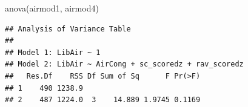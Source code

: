 \documentclass[
]{article}
\newenvironment{Shaded}{\begin{snugshade}}{\end{snugshade}}
\newcommand{\FunctionTok}[1]{\textcolor[rgb]{0.00,0.00,0.00}{#1}}
\newcommand{\NormalTok}[1]{#1}
\begin{document}
\begin{Shaded}
\begin{Highlighting}[]
\FunctionTok{anova}\NormalTok{(airmod1, airmod4)}
\end{Highlighting}
\end{Shaded}

\begin{verbatim}
## Analysis of Variance Table
## 
## Model 1: LibAir ~ 1
## Model 2: LibAir ~ AirCong + sc_scoredz + rav_scoredz
##   Res.Df    RSS Df Sum of Sq      F Pr(>F)
## 1    490 1238.9                           
## 2    487 1224.0  3    14.889 1.9745 0.1169
\end{verbatim}
\end{document}
